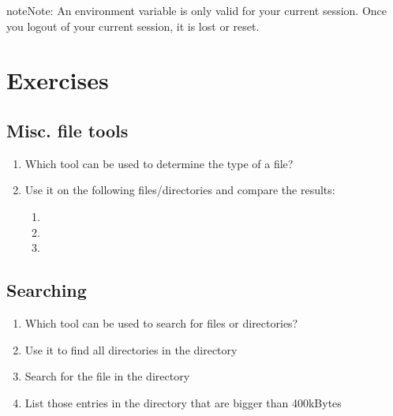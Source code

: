 \documentclass[a4paper,11pt,english]{sphinxmanual}
\begin{document}
\begin{notice}{note}{Note:}
An environment variable is only valid for your current session. Once you logout of your current session, it is lost or reset.
\end{notice}


\chapter{Exercises}
\label{exercises/exercises_beginner:exercises}\label{exercises/exercises_beginner::doc}

\section{Misc. file tools}
\label{exercises/exercises_beginner:misc-file-tools}\begin{enumerate}
\item {} 
Which tool can be used to determine the type of a file?

\item {} 
Use it on the following files/directories and compare the results:
\begin{enumerate}
\item {} 

\item {} 
\code{\textasciitilde{}}

\item {} 

\end{enumerate}

\end{enumerate}


\section{Searching}
\label{exercises/exercises_beginner:searching}\begin{enumerate}
\item {} 
Which tool can be used to search for files or directories?

\item {} 
Use it to find all directories in the  directory

\item {} 
Search for the file  in the  directory

\item {} 
List those entries in the directory  that are bigger than 400kBytes

\end{enumerate}
\end{document}

